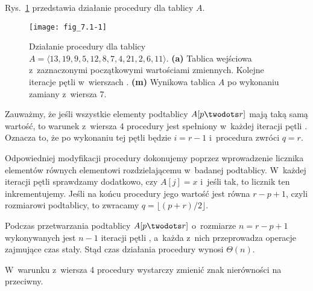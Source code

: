 
\exercise %

\noindent Rys.\ \ref{fig:7.1-1} przedstawia działanie procedury  dla tablicy $A$.
\begin{figure}[ht]
	\begin{center}
		\texttt{[image: fig\_7.1-1]}
	\end{center}
	\caption{Działanie procedury  dla tablicy $A=\langle13,19,9,5,12,8,7,4,21,2,6,11\rangle$.
{\sffamily\bfseries(a)} Tablica wejściowa z~zaznaczonymi początkowymi wartościami zmiennych.
{\sffamily\bfseries{}} Kolejne iteracje pętli  w~wierszach .
{\sffamily\bfseries(m)} Wynikowa tablica $A$ po wykonaniu zamiany z~wiersza 7.} \label{fig:7.1-1}
\end{figure}

\exercise %

\noindent Zauważmy, że jeśli wszystkie elementy podtablicy $A[p\twodots r]$ mają taką samą wartość, to warunek z~wiersza 4 procedury  jest spełniony w~każdej iteracji pętli .
Oznacza to, że po wykonaniu tej pętli będzie $i=r-1$ i~procedura zwróci $q=r$.

Odpowiedniej modyfikacji procedury dokonujemy poprzez wprowadzenie licznika elementów równych elementowi rozdzielającemu w~badanej podtablicy.
W~każdej iteracji pętli  sprawdzamy dodatkowo, czy $A[j]=x$ i~jeśli tak, to licznik ten inkrementujemy.
Jeśli na końcu procedury jego wartość jest równa $r-p+1$, czyli rozmiarowi podtablicy, to zwracamy $q=\lfloor(p+r)/2\rfloor$.

\exercise %
Podczas przetwarzania podtablicy $A[p\twodots r]$ o~rozmiarze $n=r-p+1$ wykonywanych jest $n-1$ iteracji pętli , a~każda z~nich przeprowadza operacje zajmujące czas stały.
Stąd czas działania procedury  wynosi $\Theta(n)$.

\exercise %
W~warunku z~wiersza 4 procedury  wystarczy zmienić znak nierówności na przeciwny.
